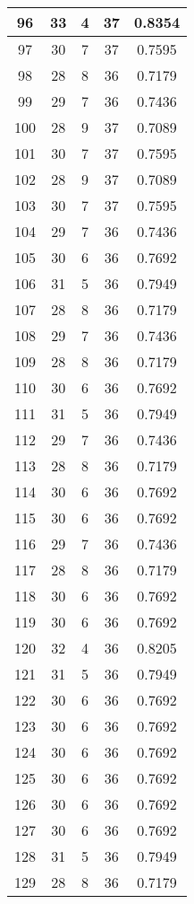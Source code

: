 \documentclass[letterpaper, 12pt]{article}
\begin{document}
\begin{longtable}{|c|c|c|c|c|}
\hline
96 & 33 & 4 & 37 & 0.8354 \\
\hline
97 & 30 & 7 & 37 & 0.7595 \\
\hline
98 & 28 & 8 & 36 & 0.7179 \\
\hline
99 & 29 & 7 & 36 & 0.7436 \\
\hline
100 & 28 & 9 & 37 & 0.7089 \\
\hline
101 & 30 & 7 & 37 & 0.7595 \\
\hline
102 & 28 & 9 & 37 & 0.7089 \\
\hline
103 & 30 & 7 & 37 & 0.7595 \\
\hline
104 & 29 & 7 & 36 & 0.7436 \\
\hline
105 & 30 & 6 & 36 & 0.7692 \\
\hline
106 & 31 & 5 & 36 & 0.7949 \\
\hline
107 & 28 & 8 & 36 & 0.7179 \\
\hline
108 & 29 & 7 & 36 & 0.7436 \\
\hline
109 & 28 & 8 & 36 & 0.7179 \\
\hline
110 & 30 & 6 & 36 & 0.7692 \\
\hline
111 & 31 & 5 & 36 & 0.7949 \\
\hline
112 & 29 & 7 & 36 & 0.7436 \\
\hline
113 & 28 & 8 & 36 & 0.7179 \\
\hline
114 & 30 & 6 & 36 & 0.7692 \\
\hline
115 & 30 & 6 & 36 & 0.7692 \\
\hline
116 & 29 & 7 & 36 & 0.7436 \\
\hline
117 & 28 & 8 & 36 & 0.7179 \\
\hline
118 & 30 & 6 & 36 & 0.7692 \\
\hline
119 & 30 & 6 & 36 & 0.7692 \\
\hline
120 & 32 & 4 & 36 & 0.8205 \\
\hline
121 & 31 & 5 & 36 & 0.7949 \\
\hline
122 & 30 & 6 & 36 & 0.7692 \\
\hline
123 & 30 & 6 & 36 & 0.7692 \\
\hline
124 & 30 & 6 & 36 & 0.7692 \\
\hline
125 & 30 & 6 & 36 & 0.7692 \\
\hline
126 & 30 & 6 & 36 & 0.7692 \\
\hline
127 & 30 & 6 & 36 & 0.7692 \\
\hline
128 & 31 & 5 & 36 & 0.7949 \\
\hline
129 & 28 & 8 & 36 & 0.7179 \\

\end{longtable}
\end{document}
